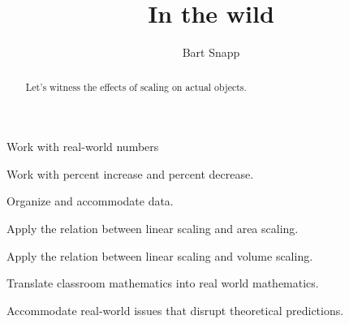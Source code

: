 \documentclass[nooutcomes,noauthor,handout]{ximera}
\title{In the wild}
\author{Bart Snapp}
\begin{document}
\begin{abstract}
  Let's witness the effects of scaling on actual objects.
\end{abstract}
\maketitle


\begin{listOutcomes}
\item Work with real-world numbers
\item Work with percent increase and percent decrease.
\item Organize and accommodate data.
\item Apply the relation between linear scaling and area scaling.
\item Apply the relation between linear scaling and volume scaling.
\item Translate classroom mathematics into real world mathematics. 
\item Accommodate real-world issues that disrupt theoretical predictions.
\end{listOutcomes}





\end{document}
